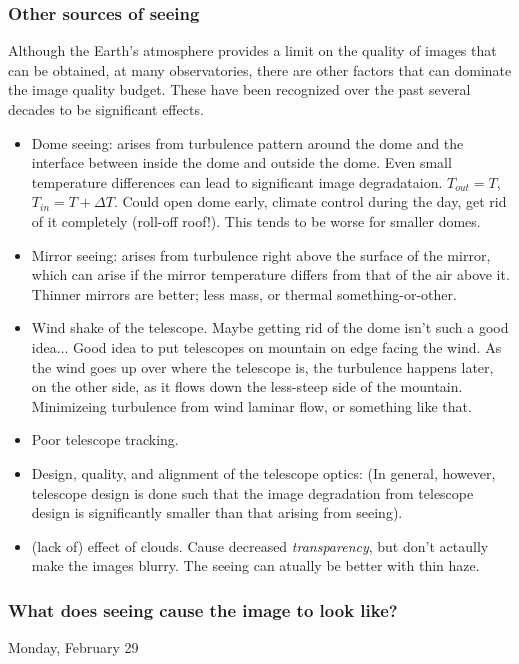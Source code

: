 \documentclass[12pt]{article}
\begin{document}
\subsubsection{Other sources of seeing}
Although the Earth's atmosphere provides a limit on the quality of
images that can be obtained, at many observatories, there are other
factors that can dominate the image quality budget. These have been
recognized over the past several decades to be significant effects.
\begin{itemize}
    \item Dome seeing: arises from turbulence pattern around the
    dome and the interface between inside the dome and outside the dome.
    Even small temperature differences can lead to significant
    image degradataion. \textcolor{myBlue}{$T_{out} = T$, $T_{in} = T
    + \Delta T$. Could open dome early, climate control during the
    day, get rid of it completely (roll-off roof!). This tends to be
    worse for smaller domes.}
    \item Mirror seeing: arises from turbulence right above the
    surface of the mirror, which can arise if the mirror temperature
    differs from that of the air above it. \textcolor{myBlue}{%
    Thinner mirrors are better; less mass, or thermal
    something-or-other}.
    \item Wind shake of the telescope. \textcolor{myBlue}{%
    Maybe getting rid of the dome isn't such a good idea$\ldots$
    Good idea to put telescopes on mountain on edge facing the wind.
    As the wind goes up over where the telescope is, the turbulence
    happens later, on the other side, as it flows down the less-steep
    side of the mountain. Minimizeing turbulence from wind laminar
    flow, or something like that.}
    \item Poor telescope tracking.
    \item Design, quality, and alignment of the telescope
    optics: (In general, however,
    telescope design is done such that the image degradation from
    telescope design is significantly smaller than that arising from
    seeing).
    \item (lack of) effect of clouds. \textcolor{myBlue}{Cause
    decreased \emph{transparency}, but don't actaully make the images
    blurry. The seeing can atually be better with thin haze.}
\end{itemize}

\subsubsection{What does seeing cause the image to look like?}
\textcolor{date}{Monday, February 29}
\end{document}
